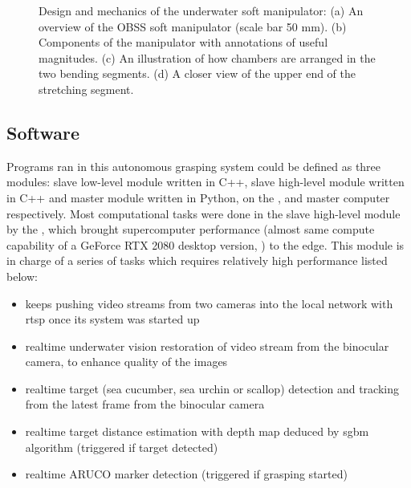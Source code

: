 \begin{figure}[htb]
    \caption[Design and Mechanics of the Underwater Soft Manipulator]{Design and
    mechanics of the underwater soft manipulator: (a) An overview of the
    \gls{OBSS} soft manipulator (scale bar 50 mm). (b) Components of the
    manipulator with annotations of useful magnitudes. (c) An illustration of
    how chambers  are arranged in the two bending segments. (d) A closer view of
    the upper end of the stretching segment.}\label{f:manipulator}
\end{figure}

\subsection{Software}

Programs ran in this autonomous grasping system could be defined as three
modules: slave low-level module written in C++, slave high-level module written
in C++ and master module written in Python, on the ,
 and master computer respectively. Most computational tasks
were done in the slave high-level module by the , which
brought supercomputer performance (almost same compute capability of a GeForce
RTX 2080 desktop version, \autocite{cc}) to the edge. This module is in charge
of a series of tasks which requires relatively high performance listed below:

\begin{itemize}
    \item keeps pushing video streams from two cameras into the local network
          with \gls{rtsp} once its system was started up
    \item realtime underwater vision restoration of video stream from the
          binocular camera, to enhance quality of the images
    \item realtime target (sea cucumber, sea urchin or scallop) detection and
          tracking from the latest frame from the binocular camera
    \item realtime target distance estimation with depth map deduced by
          \gls{sgbm} algorithm (triggered if target detected)
    \item realtime ARUCO marker detection (triggered if grasping started)
\end{itemize}

